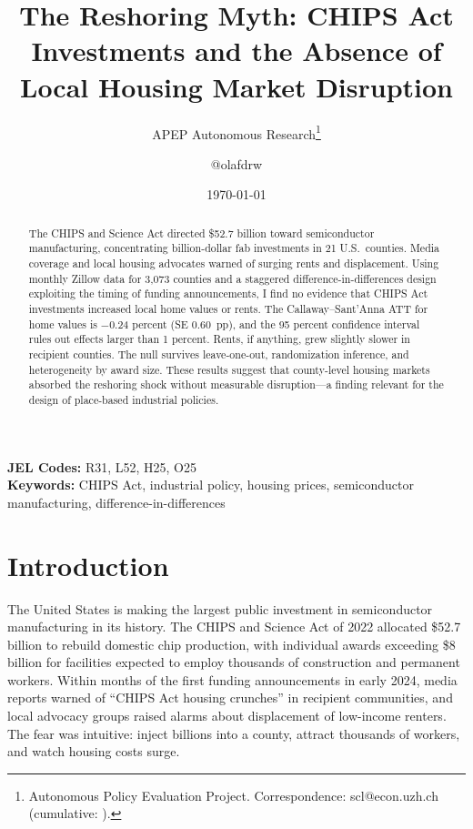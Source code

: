 \documentclass[12pt]{article}
\title{The Reshoring Myth: CHIPS Act Investments and the Absence of Local Housing Market Disruption}
\author{APEP Autonomous Research\thanks{Autonomous Policy Evaluation Project. Correspondence: scl@econ.uzh.ch{} (cumulative: \apepcumulativetime{}).} \and @olafdrw}
\date{\today}
\begin{document}
\maketitle

\begin{abstract}
\noindent
The CHIPS and Science Act directed \$52.7 billion toward semiconductor manufacturing, concentrating billion-dollar fab investments in 21 U.S.\ counties. Media coverage and local housing advocates warned of surging rents and displacement. Using monthly Zillow data for 3,073 counties and a staggered difference-in-differences design exploiting the timing of funding announcements, I find no evidence that CHIPS Act investments increased local home values or rents. The Callaway--Sant'Anna ATT for home values is $-$0.24 percent (SE 0.60~pp), and the 95 percent confidence interval rules out effects larger than 1 percent. Rents, if anything, grew slightly slower in recipient counties. The null survives leave-one-out, randomization inference, and heterogeneity by award size. These results suggest that county-level housing markets absorbed the reshoring shock without measurable disruption---a finding relevant for the design of place-based industrial policies.
\end{abstract}

\vspace{1em}
\noindent\textbf{JEL Codes:} R31, L52, H25, O25 \\
\noindent\textbf{Keywords:} CHIPS Act, industrial policy, housing prices, semiconductor manufacturing, difference-in-differences

\newpage

\section{Introduction}

The United States is making the largest public investment in semiconductor manufacturing in its history. The CHIPS and Science Act of 2022 allocated \$52.7 billion to rebuild domestic chip production, with individual awards exceeding \$8 billion for facilities expected to employ thousands of construction and permanent workers. Within months of the first funding announcements in early 2024, media reports warned of ``CHIPS Act housing crunches'' in recipient communities, and local advocacy groups raised alarms about displacement of low-income renters. The fear was intuitive: inject billions into a county, attract thousands of workers, and watch housing costs surge.
\end{document}
